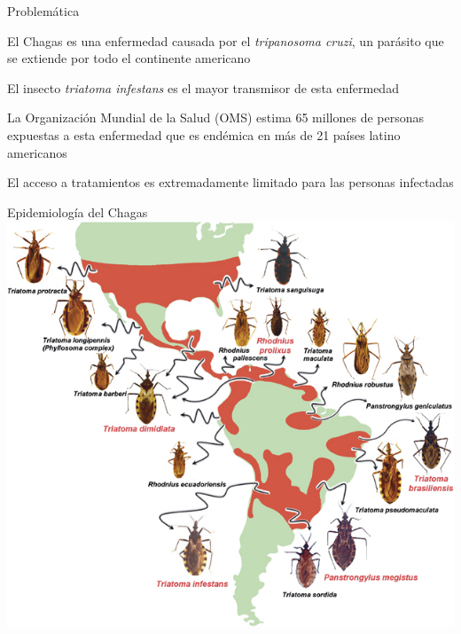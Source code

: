 \documentclass[xcolor=x11names]{beamer}
\begin{document}
\begin{frame}{Problemática}

			El Chagas es una enfermedad causada por el \textit{tripanosoma cruzi}, un parásito que se extiende por todo el continente americano

			\medskip  El insecto \textit{triatoma infestans} es el mayor transmisor de esta enfermedad

			\medskip  La Organización Mundial de la Salud (OMS) estima 65 millones de personas expuestas a esta enfermedad que es endémica en más de 21 países latino americanos

			\medskip El acceso a tratamientos es extremadamente limitado para las personas infectadas

\end{frame}


\begin{frame}{Epidemiología del Chagas}
			\includegraphics[height=.9\textheight]{slides/triatomine-map.jpg}
\end{frame}
\end{document}
